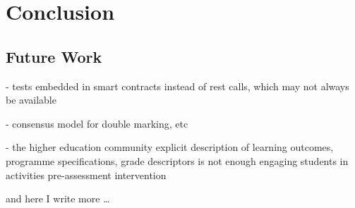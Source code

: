 \chapter{Conclusion}

\section{Future Work}

- tests embedded in smart contracts instead of rest calls, which may not always be available

- consensus model for double marking, etc

- the higher education community explicit description of learning outcomes, programme specifications, grade descriptors is not enough
engaging students in activities pre-assessment intervention \citep{bryan2006innovative}

and here I write more \dots
